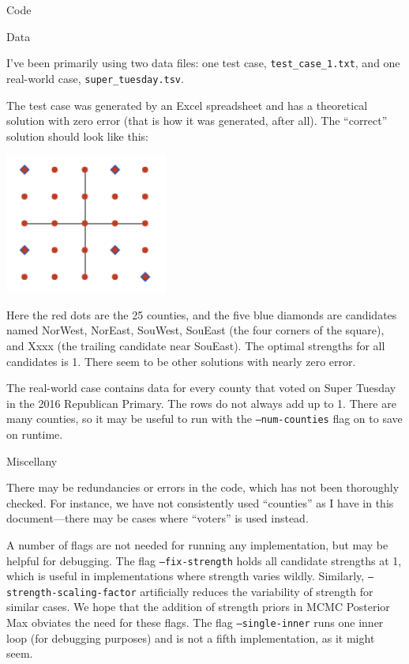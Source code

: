\documentclass{article}
\begin{document}
\begin{section}{Code}
\begin{subsection}{Data}

I've been primarily using two data files: one test case, \texttt{test\_case\_1.txt}, and one real-world case, \texttt{super\_tuesday.tsv}.

The test case was generated by an Excel spreadsheet and has a theoretical solution with zero error (that is how it was generated, after all). The ``correct'' solution should look like this:
\begin{center}
\includegraphics[width=0.4\textwidth]{test_case_1_theoretical_solution.png}
\end{center}
Here the red dots are the 25 counties, and the five blue diamonds are candidates named NorWest, NorEast, SouWest, SouEast (the four corners of the square), and Xxxx (the trailing candidate near SouEast). The optimal strengths for all candidates is 1. There seem to be other solutions with nearly zero error.

The real-world case contains data for every county that voted on Super Tuesday in the 2016 Republican Primary. The rows do not always add up to 1. There are many counties, so it may be useful to run with the \texttt{--num-counties} flag on to save on runtime.

\end{subsection}

\begin{subsection}{Miscellany}

There may be redundancies or errors in the code, which has not been thoroughly checked. For instance, we have not consistently used ``counties'' as I have in this document---there may be cases where ``voters'' is used instead.

A number of flags are not needed for running any implementation, but may be helpful for debugging. The flag \texttt{--fix-strength} holds all candidate strengths at 1, which is useful in implementations where strength varies wildly. Similarly, \texttt{--strength-scaling-factor} artificially reduces the variability of strength for similar cases. We hope that the addition of strength priors in MCMC Posterior Max obviates the need for these flags. The flag \texttt{--single-inner} runs one inner loop (for debugging purposes) and is not a fifth implementation, as it might seem.

\end{subsection}




\end{section}
\end{document}
